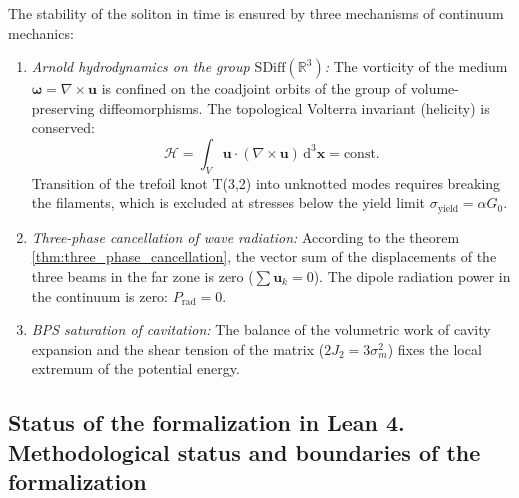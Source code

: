 \documentclass[11pt,a4paper]{article}
\theoremstyle{definition}
\theoremstyle{remark}
\begin{document}
The stability of the soliton in time is ensured by three mechanisms of continuum mechanics:
\begin{enumerate}
\item \textit{Arnold hydrodynamics on the group $\mathrm{SDiff}(\mathbb{R}^3)$:} The vorticity of the medium $\boldsymbol{\omega} = \nabla \times \mathbf{u}$ is confined on the coadjoint orbits of the group of volume-preserving diffeomorphisms. The topological Volterra invariant (helicity) is conserved:
\begin{equation}
\mathcal{H} = \int_V \mathbf{u} \cdot (\nabla \times \mathbf{u}) \, \mathrm{d}^3\mathbf{x} = \text{const}.
\end{equation}
	Transition of the trefoil knot T(3,2) into unknotted modes requires breaking the filaments, which is excluded at stresses below the yield limit $\sigma_{\mathrm{yield}} = \alpha G_0$.
\item \textit{Three-phase cancellation of wave radiation:} According to the theorem \ref{thm:three_phase_cancellation}, the vector sum of the displacements of the three beams in the far zone is zero ($\sum \mathbf{u}_k = 0$). The dipole radiation power in the continuum is zero: $P_{\mathrm{rad}} = 0$.
\item \textit{BPS saturation of cavitation:} The balance of the volumetric work of cavity expansion and the shear tension of the matrix ($2J_2 = 3\sigma_m^2$) fixes the local extremum of the potential energy.
\end{enumerate}

\subsection{Status of the formalization in Lean 4. Methodological status and boundaries of the formalization}
\label{rem:lean_formalization_scope}
\end{document}
